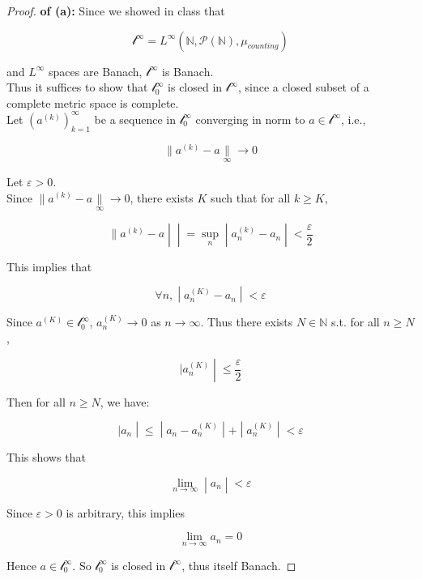 \begin{proof}

\textbf{of (a):} Since we showed in class that

\[\mathcal{l}^{\infty} = L^{\infty}(\mathbb{N},\mathcal{P}(\mathbb{N}),\mu_{counting})\]

and \(L^{\infty}\) spaces are Banach, \(\mathcal{l}^{\infty}\) is Banach.\\
Thus it suffices to show that \(\mathcal{l}_{0}^{\infty}\) is closed in \(\mathcal{l}^{\infty}\), since a closed subset of a complete metric space is complete.\\
Let \((a^{(k)})_{k = 1}^{\infty}\) be a sequence in \(\mathcal{l}_{0}^{\infty}\) converging in norm to \(a \in \mathcal{l}^{\infty}\), i.e.,

\[\parallel a^{(k)} - a\underset{\infty}{\parallel}\rightarrow 0\]

Let \(\varepsilon > 0\).\\
Since \(\parallel a^{(k)} - a\underset{\infty}{\parallel}\rightarrow 0\), there exists \(K\) such that for all \(k \geq K\),

\[\left. \parallel a^{(k)} - a \middle| \middle| = \sup\limits_{n} \middle| a_{n}^{(k)} - a_{n} \middle| < \frac{\varepsilon}{2} \right.\]

This implies that

\[\left. \forall n, \middle| a_{n}^{(K)} - a_{n} \middle| < \varepsilon \right.\]

Since \(a^{(K)} \in \mathcal{l}_{0}^{\infty}\), \(a_{n}^{(K)}\rightarrow 0\) as \(n\rightarrow\infty\). Thus there exists \(N \in \mathbb{N}\) s.t. for all \(n \geq N\),

\[\left. |a_{n}^{(K)} \middle| \leq \frac{\varepsilon}{2} \right.\]

Then for all \(n \geq N\), we have:

\[\left. |a_{n} \middle| \leq \middle| a_{n} - a_{n}^{(K)} \middle| + \middle| a_{n}^{(K)} \middle| < \varepsilon \right.\]

This shows that

\[\left. \lim\limits_{n\rightarrow\infty} \middle| a_{n} \middle| < \varepsilon \right.\]

Since \(\varepsilon > 0\) is arbitrary, this implies

\[\lim\limits_{n\rightarrow\infty}a_{n} = 0\]

Hence \(a \in \mathcal{l}_{0}^{\infty}\). So \(\mathcal{l}_{0}^{\infty}\) is closed in \(\mathcal{l}^{\infty}\), thus itself Banach.

\end{proof}

